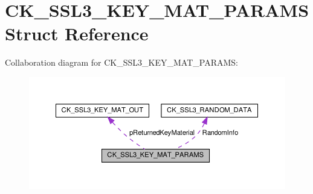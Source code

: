 \hypertarget{struct_c_k___s_s_l3___k_e_y___m_a_t___p_a_r_a_m_s}{}\section{C\+K\+\_\+\+S\+S\+L3\+\_\+\+K\+E\+Y\+\_\+\+M\+A\+T\+\_\+\+P\+A\+R\+A\+MS Struct Reference}
\label{struct_c_k___s_s_l3___k_e_y___m_a_t___p_a_r_a_m_s}


Collaboration diagram for C\+K\+\_\+\+S\+S\+L3\+\_\+\+K\+E\+Y\+\_\+\+M\+A\+T\+\_\+\+P\+A\+R\+A\+MS\+:
\nopagebreak
\begin{figure}[H]
\begin{center}
\leavevmode
\includegraphics[width=350pt]{struct_c_k___s_s_l3___k_e_y___m_a_t___p_a_r_a_m_s__coll__graph}
\end{center}
\end{figure}
